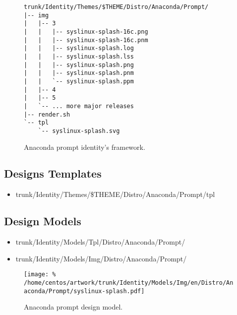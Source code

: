 
\begin{figure}[!hbp]
\hrulefill
\begin{verbatim}
trunk/Identity/Themes/$THEME/Distro/Anaconda/Prompt/
|-- img
|   |-- 3
|   |   |-- syslinux-splash-16c.png
|   |   |-- syslinux-splash-16c.pnm
|   |   |-- syslinux-splash.log
|   |   |-- syslinux-splash.lss
|   |   |-- syslinux-splash.png
|   |   |-- syslinux-splash.pnm
|   |   `-- syslinux-splash.ppm
|   |-- 4
|   |-- 5
|   `-- ... more major releases
|-- render.sh
`-- tpl
    `-- syslinux-splash.svg
\end{verbatim}
\hrulefill
\caption{Anaconda prompt identity's framework.%
   \label{fig:Distribution:Anaconda:Prompt:Identity}}
\end{figure}

\subsection{Designs Templates}
\hypertarget{sec:Distribution:Anaconda:Prompt:Identity:Templates}{}
\label{sec:Distribution:Anaconda:Prompt:Identity:Templates}

\begin{itemize}
\item trunk/Identity/Themes/\$THEME/Distro/Anaconda/Prompt/tpl
\end{itemize}

\subsection{Design Models}

\begin{itemize}
\item trunk/Identity/Models/Tpl/Distro/Anaconda/Prompt/
\item trunk/Identity/Models/Img/Distro/Anaconda/Prompt/
\end{itemize}

\begin{figure}[!hbp]
\begin{center}
\texttt{[image: \%
    /home/centos/artwork/trunk/Identity/Models/Img/en/Distro/Anaconda/Prompt/syslinux-splash.pdf]}
\end{center}
\caption{Anaconda prompt design model.%
   \label{fig:Distribution:Anaconda:Model}}
\end{figure}

